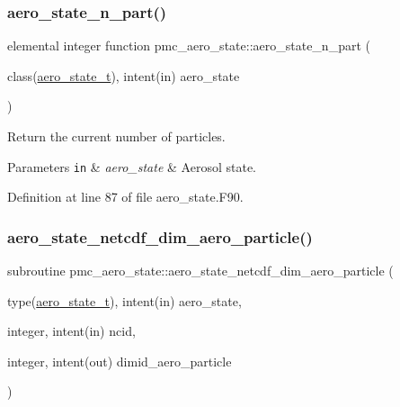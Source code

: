 \subsubsection{\texorpdfstring{aero\+\_\+state\+\_\+n\+\_\+part()}{aero\_state\_n\_part()}}
{\footnotesize\ttfamily elemental integer function pmc\+\_\+aero\+\_\+state\+::aero\+\_\+state\+\_\+n\+\_\+part (\begin{DoxyParamCaption}\item[{class(\mbox{\hyperlink{structpmc__aero__state_1_1aero__state__t}{aero\+\_\+state\+\_\+t}}), intent(in)}]{aero\+\_\+state }\end{DoxyParamCaption})}



Return the current number of particles. 


\begin{DoxyParams}[1]{Parameters}
\mbox{\tt in}  & {\em aero\+\_\+state} & Aerosol state. \\
\hline
\end{DoxyParams}


Definition at line 87 of file aero\+\_\+state.\+F90.

\mbox{\label{namespacepmc__aero__state_acb748f0c0c6c37180e896af05acb1c19}} 
\subsubsection{\texorpdfstring{aero\+\_\+state\+\_\+netcdf\+\_\+dim\+\_\+aero\+\_\+particle()}{aero\_state\_netcdf\_dim\_aero\_particle()}}
{\footnotesize\ttfamily subroutine pmc\+\_\+aero\+\_\+state\+::aero\+\_\+state\+\_\+netcdf\+\_\+dim\+\_\+aero\+\_\+particle (\begin{DoxyParamCaption}\item[{type(\mbox{\hyperlink{structpmc__aero__state_1_1aero__state__t}{aero\+\_\+state\+\_\+t}}), intent(in)}]{aero\+\_\+state,  }\item[{integer, intent(in)}]{ncid,  }\item[{integer, intent(out)}]{dimid\+\_\+aero\+\_\+particle }\end{DoxyParamCaption})}



